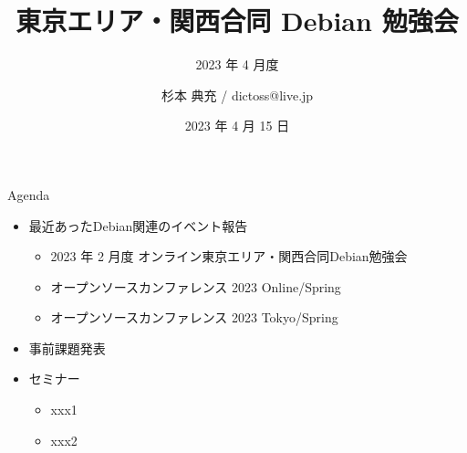 \title{東京エリア・関西合同 Debian 勉強会}
\subtitle{2023 年 4 月度} %
\author{杉本 典充 / dictoss@live.jp}
\date{2023 年 4 月 15 日}



\begin{frame}
\titlepage{}
\end{frame}

\begin{frame}{Agenda}
 \begin{minipage}[t]{0.45\hsize}
  \begin{itemize}
  \item 最近あったDebian関連のイベント報告
    \begin{itemize}
    \item 2023 年 2 月度 オンライン東京エリア・関西合同Debian勉強会
    \item オープンソースカンファレンス 2023 Online/Spring
    \item オープンソースカンファレンス 2023 Tokyo/Spring
    \end{itemize}
  \item 事前課題発表
  \end{itemize}
 \end{minipage}
 \begin{minipage}[t]{0.45\hsize}
   \begin{itemize}
   \item セミナー
     \begin{itemize}
     \item xxx1
     \item xxx2
     \end{itemize}
  \end{itemize}
 \end{minipage}
\end{frame}

